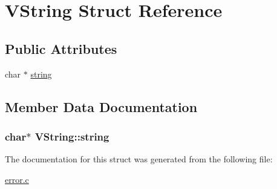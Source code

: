 \hypertarget{struct_v_string}{}\section{V\+String Struct Reference}
\label{struct_v_string}
\subsection*{Public Attributes}
\begin{DoxyCompactItemize}
\item 
char $\ast$ \hyperlink{struct_v_string_a5c80f4b8543aaaf94e4be6c2e7d422a5}{string}
\end{DoxyCompactItemize}


\subsection{Member Data Documentation}
\hypertarget{struct_v_string_a5c80f4b8543aaaf94e4be6c2e7d422a5}{}
\subsubsection[{string}]{\setlength{\rightskip}{0pt plus 5cm}char$\ast$ V\+String\+::string}\label{struct_v_string_a5c80f4b8543aaaf94e4be6c2e7d422a5}


The documentation for this struct was generated from the following file\+:\begin{DoxyCompactItemize}
\item 
\hyperlink{error_8c}{error.\+c}\end{DoxyCompactItemize}
